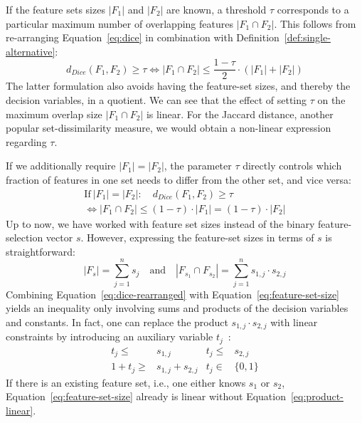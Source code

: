 \documentclass[conference]{IEEEtran}
\theoremstyle{definition}
\begin{document}
If the feature sets sizes $|F_1|$ and $|F_2|$ are known, a threshold $\tau$ corresponds to a particular maximum number of overlapping features $|F_1 \cap F_2|$.
This follows from re-arranging Equation~\ref{eq:dice} in combination with Definition~\ref{def:single-alternative}:
%
\begin{equation}
	d_{Dice}(F_1,F_2) \geq \tau \Leftrightarrow |F_1 \cap F_2| \leq \frac{1 - \tau}{2} \cdot (|F_1| + |F_2|)
	\label{eq:dice-rearranged}
\end{equation}
%
The latter formulation also avoids having the feature-set sizes, and thereby the decision variables, in a quotient.
We can see that the effect of setting $\tau$ on the maximum overlap size $|F_1 \cap F_2|$ is linear.
For the Jaccard distance, another popular set-dissimilarity measure, we would obtain a non-linear expression regarding $\tau$.

If we additionally require $|F_1| = |F_2|$, the parameter $\tau$ directly controls which fraction of features in one set needs to differ from the other set, and vice versa:
%
\begin{equation}
	\begin{aligned}
	\text{If}~|F_1| = |F_2|: \quad d_{Dice}(F_1,F_2) \geq \tau \\
	\Leftrightarrow |F_1 \cap F_2| \leq (1 - \tau) \cdot |F_1| = (1 - \tau) \cdot |F_2|
	\end{aligned}
\end{equation}
%
Up to now, we have worked with feature set sizes instead of the binary feature-selection vector $s$.
However, expressing the feature-set sizes in terms of $s$ is straightforward:
%
\begin{equation}
	|F_s| = \sum_{j=1}^n s_j \quad \text{and} \quad |F_{s_1} \cap F_{s_2}| = \sum_{j=1}^n s_{1,j} \cdot s_{2,j}
	\label{eq:feature-set-size}
\end{equation}
%
Combining Equation~\ref{eq:dice-rearranged} with Equation~\ref{eq:feature-set-size} yields an inequality only involving sums and products of the decision variables and constants.
In fact, one can replace the product $s_{1,j} \cdot s_{2,j}$ with linear constraints by introducing an auxiliary variable $t_j$~\cite{mosek2021modeling}:
%
\begin{equation}
	\begin{aligned}
	t_j \leq& s_{1,j} & t_j \leq& s_{2,j} \\
	1 + t_j \geq& s_{1,j} + s_{2,j} & t_j \in& \{0,1\}
	\end{aligned}
	\label{eq:product-linear}
\end{equation}
%
If there is an existing feature set, i.e., one either knows $s_1$ or $s_2$, Equation~\ref{eq:feature-set-size} already is linear without Equation~\ref{eq:product-linear}.
\end{document}
